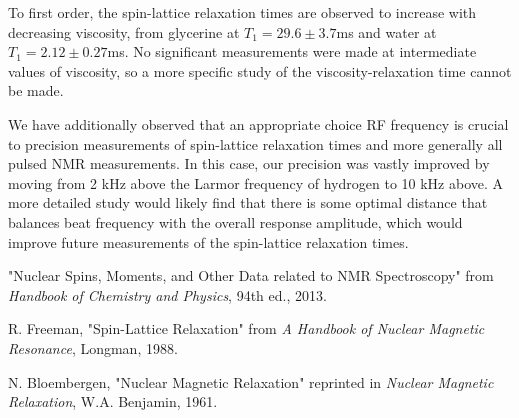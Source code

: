 To first order, the spin-lattice relaxation times are observed to increase with decreasing viscosity, from glycerine at $T_1=29.6\pm3.7$ms and water at $T_1=2.12\pm0.27$ms. No significant measurements were made at intermediate values of viscosity, so a more specific study of the viscosity-relaxation time cannot be made. 

We have additionally observed that an appropriate choice RF frequency is crucial to precision measurements of spin-lattice relaxation times and more generally all pulsed NMR measurements. In this case, our precision was vastly improved by moving from 2 kHz above the Larmor frequency of hydrogen to 10 kHz above. A more detailed study would likely find that there is some optimal distance that balances beat frequency with the overall response amplitude, which would improve future measurements of the spin-lattice relaxation times.

\begin{thebibliography}{3}

	"Nuclear Spins, Moments, and Other Data related to NMR Spectroscopy" from \emph{Handbook of Chemistry and Physics},
	94th ed.,
	2013.

	R. Freeman,
	"Spin-Lattice Relaxation" from \emph{A Handbook of Nuclear Magnetic Resonance},
	Longman,
	1988.

	N. Bloembergen,
	"Nuclear Magnetic Relaxation" reprinted in \emph{Nuclear Magnetic Relaxation},
	W.A. Benjamin,
	1961.

\end{thebibliography}


